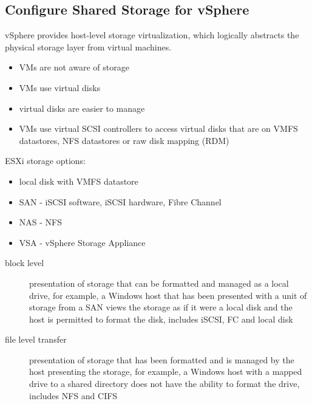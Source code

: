\subsection{Configure Shared Storage for vSphere}

vSphere provides host-level storage virtualization, which logically abstracts
the physical storage layer from virtual machines.

\begin{itemize}

\item VMs are not aware of storage

\item VMs use virtual disks

\item virtual disks are easier to manage

\item VMs use virtual SCSI controllers to access virtual disks that are on
VMFS datastores, NFS datastores or raw disk mapping (RDM)

\end{itemize}

ESXi storage options:

\begin{itemize}
\item local disk with VMFS datastore
\item SAN - iSCSI software, iSCSI hardware, Fibre Channel
\item NAS - NFS
\item VSA - vSphere Storage Appliance
\end{itemize}

\begin{description}

\item[block level]
presentation of storage that can be formatted and managed as a local drive,
for example, a Windows host that has been presented with a unit of storage
from a SAN views the storage as if it were a local disk and the host
is permitted to format the disk, includes iSCSI, FC and local disk

\item[file level transfer]
presentation of storage that has been formatted and is managed by the host
presenting the storage, for example, a Windows host with a mapped drive to a
shared directory does not have the ability to format the drive, includes
NFS and CIFS

\end{description}

